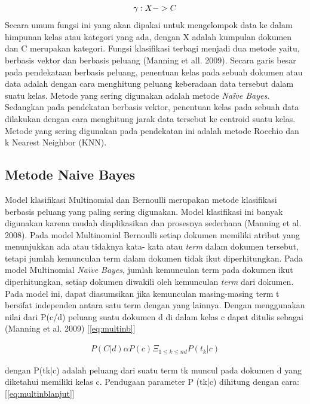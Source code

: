 \begin{equation}
\begin{split}
\tiny
\gamma : X -> C
\label{eq:klasifikasi}
\normalsize
\end{split}
\end{equation}
Secara umum fungsi ini yang akan dipakai untuk mengelompok data ke dalam himpunan kelas atau kategori yang ada, dengan X adalah kumpulan dokumen dan C merupakan kategori. Fungsi klasifikasi terbagi menjadi dua metode yaitu, berbasis vektor dan berbasis peluang (Manning et all. 2009). Secara garis besar pada pendekataan berbasis peluang, penentuan kelas pada sebuah dokumen atau data adalah dengan cara menghitung peluang keberadaan data tersebut dalam suatu kelas. Metode yang sering digunakan adalah metode \textit{Naïve Bayes}. Sedangkan pada pendekatan berbasis vektor, penentuan kelas pada sebuah data dilakukan dengan cara menghitung jarak data tersebut ke centroid suatu kelas. Metode yang sering digunakan pada pendekatan ini adalah metode Rocchio dan k Nearest Neighbor (KNN).

\subsection*{Metode Naive Bayes}
Model klasifikasi Multinomial dan Bernoulli merupakan metode klasifikasi berbasis peluang yang paling sering digunakan. Model klasifikasi ini banyak digunakan karena mudah diaplikasikan dan prosesnya sederhana (Manning et al. 2008). Pada model Multinomial Bernoulli  setiap dokumen memiliki atribut yang menunjukkan ada atau tidaknya kata- kata atau \textit{term} dalam dokumen tersebut, tetapi jumlah kemunculan term dalam dokumen tidak ikut diperhitungkan. Pada model Multinomial \textit{Naïve Bayes}, jumlah kemunculan term pada dokumen ikut diperhitungkan, setiap dokumen diwakili oleh kemunculan \textit{term} dari dokumen. Pada model ini, dapat diasumsikan jika kemunculan masing-masing term t bersifat independen antara satu term dengan yang lainnya. Dengan menggunakan nilai dari P(c/d) peluang suatu dokumen d di dalam kelas c dapat ditulis sebagai (Manning et al. 2009) [\ref{eq:multinb}]

\begin{equation}
\begin{split}
P(C|d) \alpha P(c) \Xi_{1\le k\le nd}P(t_k|c)
\label{eq:multinb}
\end{split}
\end{equation}

dengan P(tk|c) adalah peluang dari suatu term tk muncul pada dokumen d yang diketahui memiliki kelas c. Pendugaan parameter P (tk|c) dihitung dengan cara: [\ref{eq:multinblanjut}]

